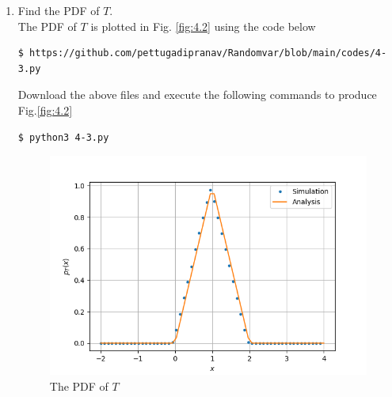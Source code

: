 \documentclass[journal,12pt,twocolumn]{IEEEtran}
\renewcommand\thesection{\arabic{section}}
\begin{document}
\begin{enumerate}[label=\thesection.\arabic*
,ref=\thesection.\theenumi]
\item Find the PDF of $T$.\\
\solution The PDF of $T$ is plotted in Fig. \ref{fig:4.2} using the code below
\begin{lstlisting}
$ https://github.com/pettugadipranav/Randomvar/blob/main/codes/4-3.py
\end{lstlisting}
Download the above files and execute the following commands to produce Fig.\ref{fig:4.2}
\begin{lstlisting}
$ python3 4-3.py
\end{lstlisting}
\begin{figure}[!h]
\centering
\includegraphics[width=\columnwidth]{./figs/4-3.png}
\caption{The PDF of $T$}
\label{fig:4.3}
\end{figure}


\end{enumerate}
\end{document}
